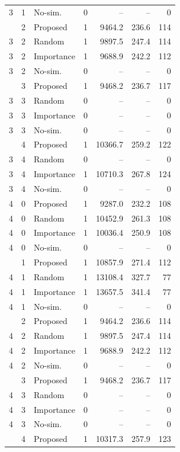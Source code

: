 \begin{table}[t]
\begin{tabular}{cc l c r r r}
3 & 1 & No-sim. & 0 & -- & -- & 0 \\
\addlinespace[1pt]
3 & 2 & Proposed & 1 & 9464.2 & 236.6 & 114 \\
3 & 2 & Random & 1 & 9897.5 & 247.4 & 114 \\
3 & 2 & Importance & 1 & 9688.9 & 242.2 & 112 \\
3 & 2 & No-sim. & 0 & -- & -- & 0 \\
\addlinespace[1pt]
3 & 3 & Proposed & 1 & 9468.2 & 236.7 & 117 \\
3 & 3 & Random & 0 & -- & -- & 0 \\
3 & 3 & Importance & 0 & -- & -- & 0 \\
3 & 3 & No-sim. & 0 & -- & -- & 0 \\
\addlinespace[1pt]
3 & 4 & Proposed & 1 & 10366.7 & 259.2 & 122 \\
3 & 4 & Random & 0 & -- & -- & 0 \\
3 & 4 & Importance & 1 & 10710.3 & 267.8 & 124 \\
3 & 4 & No-sim. & 0 & -- & -- & 0 \\
\midrule
4 & 0 & Proposed & 1 & 9287.0 & 232.2 & 108 \\
4 & 0 & Random & 1 & 10452.9 & 261.3 & 108 \\
4 & 0 & Importance & 1 & 10036.4 & 250.9 & 108 \\
4 & 0 & No-sim. & 0 & -- & -- & 0 \\
\addlinespace[1pt]
4 & 1 & Proposed & 1 & 10857.9 & 271.4 & 112 \\
4 & 1 & Random & 1 & 13108.4 & 327.7 & 77 \\
4 & 1 & Importance & 1 & 13657.5 & 341.4 & 77 \\
4 & 1 & No-sim. & 0 & -- & -- & 0 \\
\addlinespace[1pt]
4 & 2 & Proposed & 1 & 9464.2 & 236.6 & 114 \\
4 & 2 & Random & 1 & 9897.5 & 247.4 & 114 \\
4 & 2 & Importance & 1 & 9688.9 & 242.2 & 112 \\
4 & 2 & No-sim. & 0 & -- & -- & 0 \\
\addlinespace[1pt]
4 & 3 & Proposed & 1 & 9468.2 & 236.7 & 117 \\
4 & 3 & Random & 0 & -- & -- & 0 \\
4 & 3 & Importance & 0 & -- & -- & 0 \\
4 & 3 & No-sim. & 0 & -- & -- & 0 \\
\addlinespace[1pt]
4 & 4 & Proposed & 1 & 10317.3 & 257.9 & 123 \\

\end{tabular}
\end{table}

